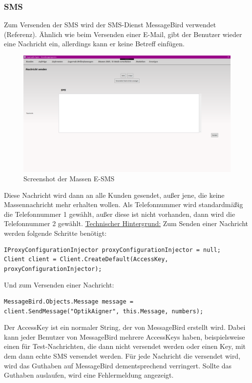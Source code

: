 \subsubsection{SMS}
Zum Versenden der SMS wird der SMS-Dienst MessageBird verwendet (Referenz). Ähnlich wie beim Versenden einer E-Mail, gibt der Benutzer wieder eine Nachricht ein, allerdings kann er keine Betreff einfügen.
\begin{figure}[H]
\begin{center}
	\includegraphics[scale=.25]{images/Massensms.png}
\end{center}
	\caption{Screenshot der Massen E-SMS}
	\label{fig:sample}
\end{figure}
Diese Nachricht wird dann an alle Kunden gesendet, außer jene, die keine Massennachricht mehr erhalten wollen. Als Telefonnummer wird standardmäßig die Telefonnummer 1 gewählt, außer diese ist nicht vorhanden, dann wird die Telefonnummer 2 gewählt. 
\newpage
\underline{Technischer Hintergrund:}
\linebreak
\linebreak 
Zum Senden einer Nachricht werden folgende Schritte benötigt:
\begin{lstlisting}
IProxyConfigurationInjector proxyConfigurationInjector = null;
Client client = Client.CreateDefault(AccessKey, proxyConfigurationInjector);
\end{lstlisting}
Und zum Versenden einer Nachricht:
\begin{lstlisting}
MessageBird.Objects.Message message = client.SendMessage("OptikAigner", this.Message, numbers);
\end{lstlisting}
Der AccessKey ist ein normaler String, der von MessageBird erstellt wird. Dabei kann jeder Benutzer von MessageBird mehrere AccessKeys haben, beispielsweise einen für Test-Nachrichten, die dann nicht versendet werden oder einen Key, mit dem dann echte SMS versendet werden.
Für jede Nachricht die versendet wird, wird das Guthaben auf MessageBird dementsprechend verringert. Sollte das Guthaben auslaufen, wird eine Fehlermeldung angezeigt.

